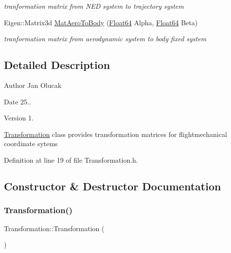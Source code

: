 \begin{DoxyCompactItemize}
\begin{DoxyCompactList}\small\item\em tranformation matrix from N\+ED system to trajectory system \end{DoxyCompactList}\item 
Eigen\+::\+Matrix3d \hyperlink{class_transformation_a9a1ea1611b6e3403ef1f522caf332226}{Mat\+Aero\+To\+Body} (\hyperlink{group___tools_ga3f1431cb9f76da10f59246d1d743dc2c}{Float64} Alpha, \hyperlink{group___tools_ga3f1431cb9f76da10f59246d1d743dc2c}{Float64} Beta)
\begin{DoxyCompactList}\small\item\em tranformation matrix from aerodynamic system to body fixed system \end{DoxyCompactList}\end{DoxyCompactItemize}


\subsection{Detailed Description}
\begin{DoxyAuthor}{Author}
Jan Olucak 
\end{DoxyAuthor}
\begin{DoxyDate}{Date}
25.. 
\end{DoxyDate}
\begin{DoxyVersion}{Version}
1.
\end{DoxyVersion}
\hyperlink{class_transformation}{Transformation} class provides transformation matrices for flightmechanical coordinate sytems 

Definition at line 19 of file Transformation.\+h.



\subsection{Constructor \& Destructor Documentation}
\mbox{\label{class_transformation_a40ab64d41c752804740e972ef5f2479f}} 
\subsubsection{\texorpdfstring{Transformation()}{Transformation()}}
{\footnotesize\ttfamily Transformation\+::\+Transformation (\begin{DoxyParamCaption}{ }\end{DoxyParamCaption})}



